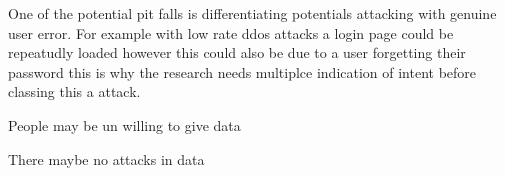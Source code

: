 One of the potential pit falls is differentiating potentials attacking with genuine user error. For example with low rate ddos attacks a login page could be repeatudly loaded however this could also be due to a user forgetting their password this is why the research needs multiplce indication of intent before classing this a attack.  

People may be un willing to give data

There maybe no attacks in data

